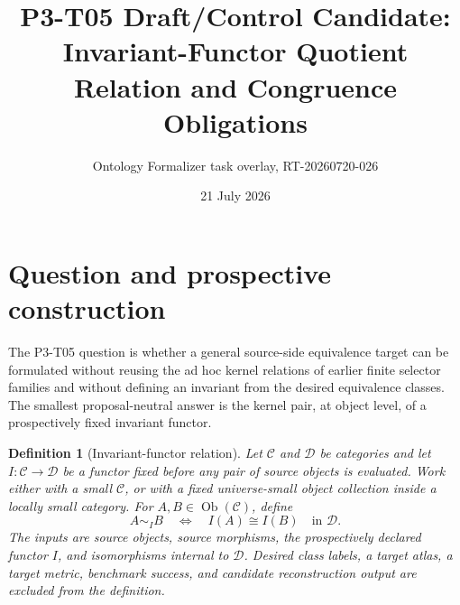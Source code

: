 \documentclass[11pt]{article}
\title{P3-T05 Draft/Control Candidate:\\
Invariant-Functor Quotient Relation and Congruence Obligations}
\author{Ontology Formalizer task overlay, RT-20260720-026}
\date{21 July 2026}
\newtheorem{definition}{Definition}
\newcommand{\EqI}{\mathrel{\sim_I}}
\begin{document}
\maketitle

\begin{center}
\end{center}

\section{Question and prospective construction}

The P3-T05 question is whether a general source-side equivalence target can be
formulated without reusing the ad hoc kernel relations of earlier finite
selector families and without defining an invariant from the desired
equivalence classes.  The smallest proposal-neutral answer is the kernel pair,
at object level, of a prospectively fixed invariant functor.

\begin{definition}[Invariant-functor relation]
Let \(\mathcal C\) and \(\mathcal D\) be categories and let
\(I:\mathcal C\to\mathcal D\) be a functor fixed before any pair of source
objects is evaluated.  Work either with a small \(\mathcal C\), or with a
fixed universe-small object collection inside a locally small category.  For
\(A,B\in\operatorname{Ob}(\mathcal C)\), define
\begin{equation}
  A\EqI B
  \quad\Longleftrightarrow\quad
  I(A)\cong I(B)\quad\text{in }\mathcal D .
  \label{eq:kernel-relation}
\end{equation}
The inputs are source objects, source morphisms, the prospectively declared
functor \(I\), and isomorphisms internal to \(\mathcal D\).  Desired class
labels, a target atlas, a target metric, benchmark success, and candidate
reconstruction output are excluded from the definition.
\end{definition}
\end{document}
